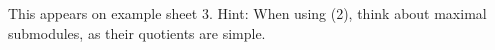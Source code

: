 This appears on example sheet 3. Hint: When using (2), think about maximal
submodules, as their quotients are simple.
